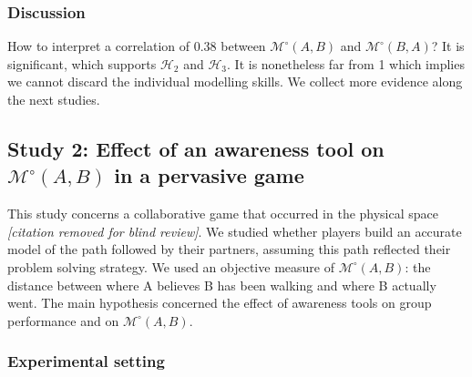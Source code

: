 \documentclass[natbib]{svjour3}
\newcommand{\A}{A\xspace}
\newcommand{\B}{B\xspace}
\newcommand{\gModel}[2]{{$\mathcal{M}^{\circ}(#1, #2)$}}
\begin{document}
\subsubsection*{Discussion}

How to interpret a correlation of 0.38 between \gModel{A}{B} and \gModel{B}{A}?
It is significant, which supports $\mathcal{H}_{2}$ and $\mathcal{H}_{3}$. It is
nonetheless far from 1 which implies we cannot discard the individual modelling
skills. We collect more evidence along the next studies.



\subsection{{\bf Study 2}: Effect of an awareness tool on \gModel{A}{B}  in a pervasive
game}

This study concerns a collaborative game that occurred in the physical
space \textit{[citation removed for blind review]}. We studied whether players
build an accurate model of the path followed by their partners, assuming this
path reflected their problem solving strategy. We used an objective measure of
\gModel{A}{B}: the distance between where \A believes \B has been walking and
where \B actually went.  The main hypothesis concerned the effect of awareness
tools on group performance and on \gModel{A}{B}. 

\subsubsection*{Experimental setting}
\end{document}

